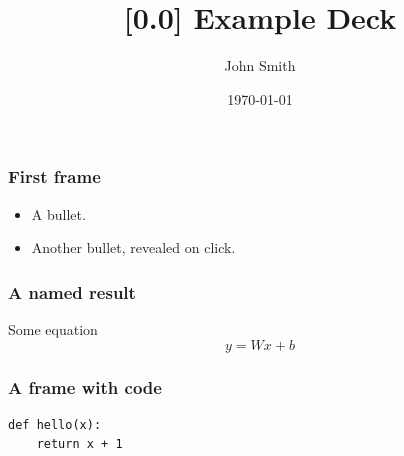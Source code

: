 %
\providecommand{\HANDOUT}{1}




\title[{[0.0] Example Deck}]
{{[0.0] Example Deck}}

\author[John Smith]
{John Smith}


\date[\today]
{\today}

\frame{\titlepage}

\begin{frame}
\frametitle{First frame}
\begin{itemize}
    \item A bullet.
    \pause
    \item Another bullet, revealed on click.
\end{itemize}
\end{frame}

\begin{frame}
\frametitle{A named result}
\begin{block}{Some equation}
    $$ y = Wx + b $$
\end{block}
\end{frame}

\begin{frame}[fragile]
\frametitle{A frame with code}
\begin{block}{}
\begin{lstlisting}
def hello(x):
    return x + 1
\end{lstlisting}
\end{block}
\end{frame}

